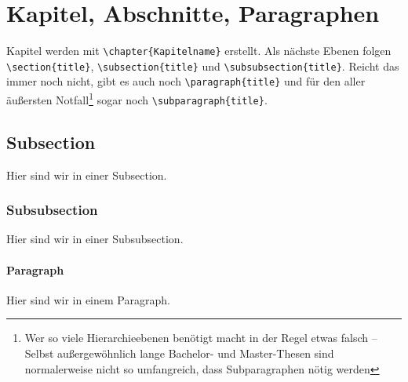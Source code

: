 	\section{Kapitel, Abschnitte, Paragraphen}\label{sec:chapter-section-paragraph}
		Kapitel werden mit \lstinline|\chapter{Kapitelname}| erstellt.
		Als nächste Ebenen folgen \lstinline|\section{title}|, \lstinline|\subsection{title}| und \lstinline|\subsubsection{title}|.
		Reicht das immer noch nicht, gibt es auch noch \lstinline|\paragraph{title}| und für den aller äußersten Notfall\footnote{Wer so viele Hierarchieebenen benötigt macht in der Regel etwas falsch -- Selbst außergewöhnlich lange Bachelor- und Master-Thesen sind normalerweise nicht so umfangreich, dass Subparagraphen nötig werden} sogar noch \lstinline|\subparagraph{title}|.
		\begin{vorlagenbeispiel}
			\subsection{Subsection}
				Hier sind wir in einer Subsection.
				\subsubsection{Subsubsection}
					Hier sind wir in einer Subsubsection.
					\paragraph{Paragraph}
						Hier sind wir in einem Paragraph.
		\end{vorlagenbeispiel}
		
